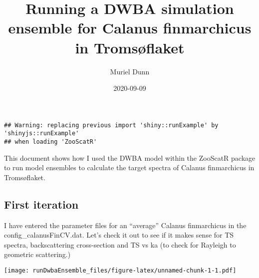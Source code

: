 \documentclass[
]{article}
\title{Running a DWBA simulation ensemble for Calanus finmarchicus in
Tromsøflaket}
\author{Muriel Dunn}
\date{2020-09-09}
\newenvironment{Shaded}{\begin{snugshade}}{\end{snugshade}}
\newcommand{\CommentTok}[1]{\textcolor[rgb]{0.56,0.35,0.01}{\textit{#1}}}
\newcommand{\DataTypeTok}[1]{\textcolor[rgb]{0.13,0.29,0.53}{#1}}
\newcommand{\DecValTok}[1]{\textcolor[rgb]{0.00,0.00,0.81}{#1}}
\newcommand{\KeywordTok}[1]{\textcolor[rgb]{0.13,0.29,0.53}{\textbf{#1}}}
\newcommand{\NormalTok}[1]{#1}
\newcommand{\OperatorTok}[1]{\textcolor[rgb]{0.81,0.36,0.00}{\textbf{#1}}}
\newcommand{\StringTok}[1]{\textcolor[rgb]{0.31,0.60,0.02}{#1}}
\begin{document}
\maketitle

\begin{verbatim}
## Warning: replacing previous import 'shiny::runExample' by 'shinyjs::runExample'
## when loading 'ZooScatR'
\end{verbatim}

This document shows how I used the DWBA model within the ZooScatR
package to run model ensembles to calculate the target spectra of
Calanus finmarchicus in Tromsøflaket.

\hypertarget{first-iteration}{%
\subsection{First iteration}\label{first-iteration}}

I have entered the parameter files for an ``average'' Calanus
finmarchicus in the config\_calanusFinCV.dat. Let's check it out to see
if it makes sense for TS spectra, backscattering cross-section and TS vs
ka (to check for Rayleigh to geometric scattering.)

\begin{Shaded}
\end{Shaded}

\texttt{[image: runDwbaEnsemble\_files/figure-latex/unnamed-chunk-1-1.pdf]}

\begin{Shaded}
\end{Shaded}
\end{document}

